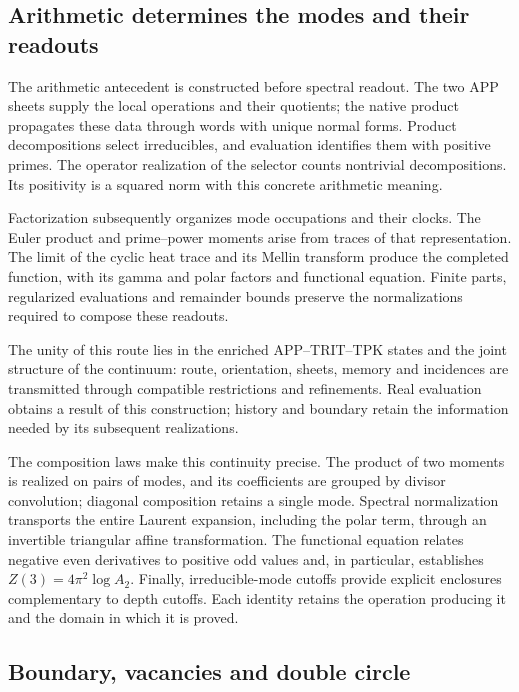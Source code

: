 \subsection*{Arithmetic determines the modes and their readouts}

The arithmetic antecedent is constructed before spectral
readout. The two APP sheets supply the local operations
and their quotients; the native product propagates these
data through words with unique normal forms. Product
decompositions select irreducibles, and evaluation
identifies them with positive primes. The operator
realization of the selector counts nontrivial
decompositions. Its positivity is a squared norm with
this concrete arithmetic meaning.

Factorization subsequently organizes mode occupations
and their clocks. The Euler product and prime--power
moments arise from traces of that representation.
The limit of the cyclic heat trace and its Mellin
transform produce the completed function, with its
gamma and polar factors and functional equation.
Finite parts, regularized evaluations and remainder
bounds preserve the normalizations required to compose
these readouts.

The unity of this route lies in the enriched
APP--TRIT--TPK states and the joint structure of the
continuum: route, orientation, sheets, memory and
incidences are transmitted through compatible
restrictions and refinements. Real evaluation obtains
a result of this construction; history and boundary
retain the information needed by its subsequent
realizations.

The composition laws make this continuity precise. The product of two
moments is realized on pairs of modes, and its coefficients are grouped
by divisor convolution; diagonal composition retains a single mode.
Spectral normalization transports the entire Laurent expansion,
including the polar term, through an invertible triangular affine
transformation. The functional equation relates negative even
derivatives to positive odd values and, in particular, establishes
$Z(3)=4\pi^2\log A_2$. Finally, irreducible-mode cutoffs provide
explicit enclosures complementary to depth cutoffs. Each identity
retains the operation producing it and the domain in which it is proved.

\subsection*{Boundary, vacancies and double circle}

